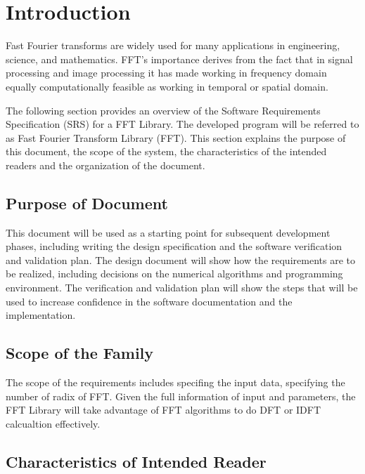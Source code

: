 \documentclass[12pt]{article}
\newcommand{\famname}{FFT} %
\begin{document}

\section{Introduction}

Fast Fourier transforms are widely used for many applications in engineering, science, and mathematics. FFT's importance derives from the fact that in signal processing and image processing it has made working in frequency domain equally computationally feasible as working in temporal or spatial domain. \\


The following section provides an overview of the Software Requirements
Specification (SRS) for a FFT Library.  The
developed program will be referred to as Fast Fourier Transform Library
(\famname{}).  This section explains the purpose of this document, the scope of
the system, the characteristics of the intended readers and the organization of
the document.

\subsection{Purpose of Document}

This document will be  used as a starting point for subsequent development phases, including writing the design specification and the software verification and validation plan.
The design document will show how the requirements are to be realized, including decisions on the numerical algorithms and programming environment.
The verification and validation plan will show the steps that will be used to increase confidence in the software documentation and the implementation.

\subsection{Scope of the Family} 

The scope of the requirements includes specifing  the input
data, specifying the number of radix of FFT. Given the full information of input
and parameters, the FFT Library will take advantage of FFT algorithms to do DFT
or IDFT calcualtion  effectively.

\subsection{Characteristics of Intended Reader} 
\end{document}
